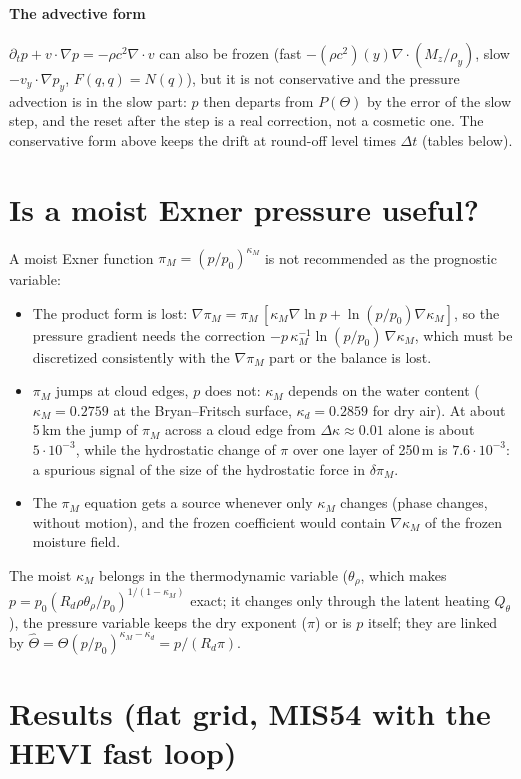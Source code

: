 \documentclass[11pt,a4paper]{article}
\newcommand{\dt}{\Delta t}
\begin{document}
\paragraph{The advective form} $\partial_tp+v\cdot\nabla p=-\rho c^2\nabla\cdot v$ can also be frozen
(fast $-(\rho c^2)(y)\nabla\cdot(M_z/\rho_y)$, slow $-v_y\cdot\nabla p_y$, $F(q,q)=N(q)$), but it is not
conservative and the pressure advection is in the slow part: $p$ then departs from $P(\Theta)$ by the
error of the slow step, and the reset after the step is a real correction, not a cosmetic one. The
conservative form above keeps the drift at round-off level times $\dt$ (tables below).

\section{Is a moist Exner pressure useful?}
A moist Exner function $\pi_M=(p/p_0)^{\kappa_M}$ is not recommended as the prognostic variable:
\begin{itemize}
\item The product form is lost: $\nabla\pi_M=\pi_M\,[\kappa_M\nabla\ln p+\ln(p/p_0)\nabla\kappa_M]$, so the
  pressure gradient needs the correction $-p\,\kappa_M^{-1}\ln(p/p_0)\,\nabla\kappa_M$, which must be
  discretized consistently with the $\nabla\pi_M$ part or the balance is lost.
\item $\pi_M$ jumps at cloud edges, $p$ does not: $\kappa_M$ depends on the water content
  ($\kappa_M=0.2759$ at the Bryan--Fritsch surface, $\kappa_d=0.2859$ for dry air). At about 5\,km the
  jump of $\pi_M$ across a cloud edge from $\Delta\kappa\approx0.01$ alone is about $5\cdot10^{-3}$, while
  the hydrostatic change of $\pi$ over one layer of 250\,m is $7.6\cdot10^{-3}$: a spurious signal of the
  size of the hydrostatic force in $\delta\pi_M$.
\item The $\pi_M$ equation gets a source whenever only $\kappa_M$ changes (phase changes,
  without motion), and the frozen coefficient would contain $\nabla\kappa_M$ of the frozen
  moisture field.
\end{itemize}
The moist $\kappa_M$ belongs in the thermodynamic variable ($\theta_\rho$, which makes
$p=p_0(R_d\rho\theta_\rho/p_0)^{1/(1-\kappa_M)}$ exact; it changes only through the latent heating $Q_\theta$), the
pressure variable keeps the dry exponent ($\pi$) or is $p$ itself; they are linked by
$\hat\Theta=\Theta(p/p_0)^{\kappa_M-\kappa_d}=p/(R_d\pi)$.

\section{Results (flat grid, MIS54 with the HEVI fast loop)}
\end{document}
